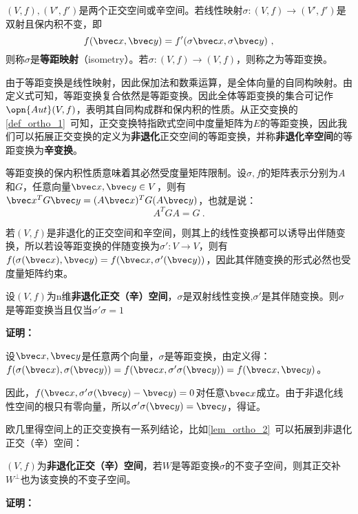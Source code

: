

\begin{definition}{}
$(V,f),(V',f')$是两个正交空间或辛空间。若线性映射$\sigma:(V,f)\rightarrow (V',f')$是双射且保内积不变，即\begin{equation}
f(\bvec x,\bvec y)=f'(\sigma \bvec x,\sigma \bvec y)~,
\end{equation}
则称$\sigma $是\textbf{等距映射}（isometry）。若$\sigma:(V,f)\rightarrow (V,f)$，则称之为等距变换。
\end{definition}
由于等距变换是线性映射，因此保加法和数乘运算，是全体向量的自同构映射。由定义式可知，等距变换复合依然是等距变换。因此全体等距变换的集合可记作$\opn{Aut}(V,f)$，表明其自同构成群和保内积的性质。从正交变换的\autoref{def_ortho_1}~可知，正交变换特指欧式空间中度量矩阵为$E$的等距变换，因此我们可以拓展正交变换的定义为\textbf{非退化}正交空间的等距变换，并称\textbf{非退化}\textbf{辛空间}的等距变换为\textbf{辛变换}。

等距变换的保内积性质意味着其必然受度量矩阵限制。设$\sigma,f$的矩阵表示分别为$A$和$G$，任意向量$\bvec x,\bvec y\in V$，则有$\bvec x^{T}G\bvec y=(A\bvec x)^TG(A\bvec y)$，也就是说：
\begin{equation}
A^TGA=G~.
\end{equation}

若$(V,f)$是非退化的正交空间和辛空间，则其上的线性变换都可以诱导出伴随变换，所以若设等距变换的伴随变换为$\sigma':V\rightarrow V$，则有$f(\sigma(\bvec x),\bvec y)=f(\bvec x,\sigma'(\bvec y))$，因此其伴随变换的形式必然也受度量矩阵约束。
\begin{theorem}{}
设$(V,f)$为n维\textbf{非退化正交（辛）空间}，$\sigma$是双射线性变换,$\sigma'$是其伴随变换。则$\sigma$是等距变换当且仅当$\sigma'\sigma=1$
\end{theorem}
\textbf{证明：}

设$\bvec x,\bvec y$是任意两个向量，$\sigma$是等距变换，由定义得：$f(\sigma(\bvec x),\sigma(\bvec y))=f(\bvec x,\sigma'\sigma(\bvec y))=f(\bvec x,\bvec y)$。

因此，$f(\bvec x,\sigma'\sigma(\bvec y)-\bvec y)=0$对任意$\bvec x$成立。由于非退化线性空间的根只有零向量，所以$\sigma'\sigma(\bvec y)=\bvec y$，得证。

欧几里得空间上的正交变换有一系列结论，比如\autoref{lem_ortho_2}~可以拓展到非退化正交（辛）空间：
\begin{theorem}{}
$(V,f)$为\textbf{非退化正交（辛）空间}，若$W$是等距变换$\sigma$的不变子空间，则其正交补$W^{\bot}$也为该变换的不变子空间。
\end{theorem}
\textbf{证明：}

